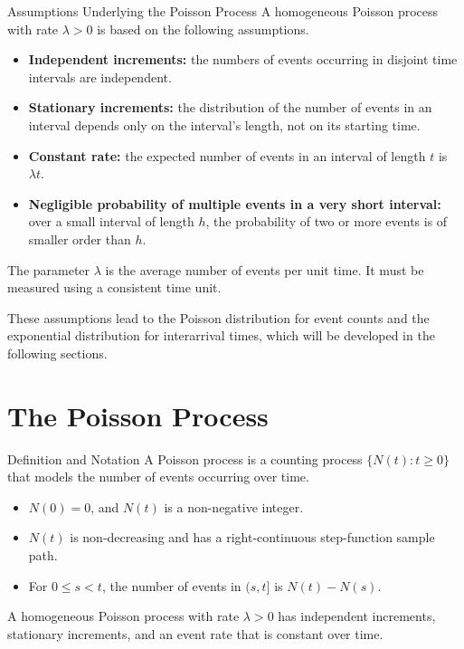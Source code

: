 \documentclass[
  ignorenonframetext,
  aspectratio=169,
]{beamer}
\providecommand{\tightlist}{%
  \setlength{\itemsep}{0pt}\setlength{\parskip}{0pt}}
\begin{document}
\begin{frame}{Assumptions Underlying the Poisson Process}
\protect{}\label{assumptions-underlying-the-poisson-process}
A homogeneous Poisson process with rate \(\lambda>0\) is based on the
following assumptions.

\begin{itemize}
\tightlist
\item
  \textbf{Independent increments:} the numbers of events occurring in
  disjoint time intervals are independent.
\item
  \textbf{Stationary increments:} the distribution of the number of
  events in an interval depends only on the interval's length, not on
  its starting time.
\item
  \textbf{Constant rate:} the expected number of events in an interval
  of length \(t\) is \(\lambda t\).
\item
  \textbf{Negligible probability of multiple events in a very short
  interval:} over a small interval of length \(h\), the probability of
  two or more events is of smaller order than \(h\).
\end{itemize}

The parameter \(\lambda\) is the average number of events per unit time.
It must be measured using a consistent time unit.

These assumptions lead to the Poisson distribution for event counts and
the exponential distribution for interarrival times, which will be
developed in the following sections.
\end{frame}

\section{The Poisson Process}\label{the-poisson-process}

\begin{frame}{Definition and Notation}
\protect{}\label{definition-and-notation}
A Poisson process is a counting process \(\{N(t):t\geq 0\}\) that models
the number of events occurring over time.

\begin{itemize}
\tightlist
\item
  \(N(0)=0\), and \(N(t)\) is a non-negative integer.
\item
  \(N(t)\) is non-decreasing and has a right-continuous step-function
  sample path.
\item
  For \(0\leq s<t\), the number of events in \((s,t]\) is \(N(t)-N(s)\).
\end{itemize}

A homogeneous Poisson process with rate \(\lambda>0\) has independent
increments, stationary increments, and an event rate that is constant
over time.
\end{frame}
\end{document}
